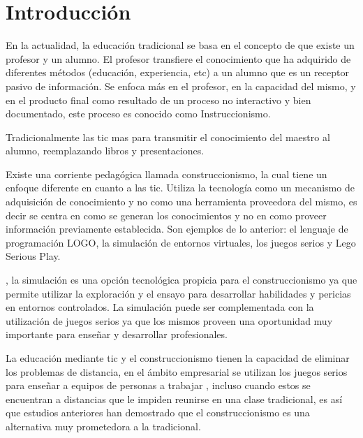 \chapter{Introducción}

En la actualidad, la educación tradicional se basa en el concepto de que existe
un profesor y un alumno. El
profesor transfiere el conocimiento que ha adquirido de diferentes métodos
(educación, experiencia, etc) a un alumno que es un receptor pasivo de
información\cite{laptop:instructionism}. Se enfoca más en el profesor, en la
capacidad del mismo, y en el producto final como resultado de un proceso no
interactivo y bien documentado\cite{igi:instructionism}, este proceso es
conocido como Instruccionismo.

Tradicionalmente las \Gls{tic}  mas para transmitir el conocimiento del maestro al alumno,
reemplazando libros y presentaciones.

Existe una corriente pedagógica llamada construccionismo, la cual
tiene un enfoque diferente en cuanto a las \Gls{tic}. Utiliza la tecnología como
un mecanismo de adquisición de conocimiento y no como una herramienta proveedora
del mismo\cite{sasha:construtivism}, es decir se centra en como se generan los
conocimientos y no en como proveer información previamente establecida. Son
ejemplos de lo anterior: el lenguaje de programación LOGO, la simulación de
entornos virtuales, los juegos serios y Lego Serious Play.

, la
simulación es una opción tecnológica propicia para el construccionismo ya que
permite utilizar la exploración y el ensayo para desarrollar habilidades y
pericias en entornos controlados\cite{humphreys2013developing}. La simulación
puede ser complementada con la utilización de juegos serios ya que los mismos
proveen una oportunidad muy importante para enseñar y desarrollar
profesionales\cite{sg:aoverview}.

La educación mediante \Gls{tic} y el construccionismo tienen la capacidad de
eliminar los problemas de distancia, en el ámbito empresarial se utilizan los
juegos serios para enseñar a equipos de personas a trabajar , incluso cuando estos
se encuentran a distancias que le impiden reunirse en una clase
tradicional\cite{mariluz:seiousgames}, es así que estudios anteriores han
demostrado que el construccionismo es una alternativa muy prometedora a la
 tradicional\cite{sasha:construtivism}.

